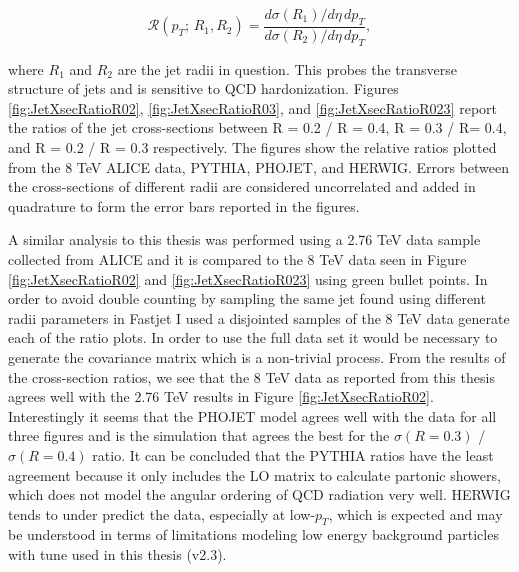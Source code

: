 \begin{equation}
\mathscr{R} (p_{T}; \, R_{1},R_{2}) = \frac{d\sigma(R_{1}) /d\eta \, dp_{T} }{d\sigma (R_{2}) /d\eta \, dp_{T}},
\label{eq:jetxsecratio}
\end{equation}

\noindent
where $R_{1}$ and $R_{2}$ are the jet radii in question. This probes the transverse structure of jets and is sensitive to QCD hardonization\cite{SOYEZ201159}.  Figures \ref{fig:JetXsecRatioR02}, \ref{fig:JetXsecRatioR03}, and \ref{fig:JetXsecRatioR023} report the ratios of the jet cross-sections between R = 0.2 / R = 0.4, R = 0.3 / R= 0.4, and R = 0.2 / R = 0.3 respectively.  The figures show the relative ratios plotted from the 8 TeV ALICE data, PYTHIA, PHOJET, and HERWIG.  Errors between the cross-sections of different radii are considered uncorrelated and added in quadrature to form the error bars reported in the figures.



A similar analysis to this thesis was performed using a 2.76 TeV  data sample collected from ALICE\cite{MA2013319} and it is compared to the 8 TeV data seen in Figure \ref{fig:JetXsecRatioR02} and \ref{fig:JetXsecRatioR023} using green bullet points.  
In order to avoid double counting by sampling the same jet found using different radii parameters in Fastjet I used a disjointed samples of the 8 TeV data generate each of the ratio plots.  In order to use the full data set it would be necessary to generate the covariance matrix which is a non-trivial process.   From the results of the cross-section ratios, we see that the 8 TeV data as reported from this thesis agrees well with the 2.76 TeV results in Figure \ref{fig:JetXsecRatioR02}.  Interestingly it seems that the PHOJET model agrees well with the data for all three figures and is the simulation that agrees the best for the $\sigma (R = 0.3)$ / $\sigma (R = 0.4)$ ratio.  It can be concluded that the PYTHIA ratios have the least agreement because it only includes the LO matrix to calculate partonic showers, which does not model the angular ordering of QCD radiation very well.  HERWIG tends to under predict the data, especially at low-$p_{T}$, which is expected and may be understood in terms of limitations modeling low energy background particles with tune used in this thesis (v2.3).  

